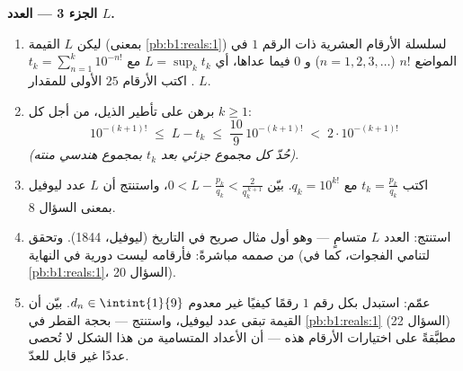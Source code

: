 \begin{problem}
\medskip
\noindent\textbf{الجزء 3 --- العدد $L$.}
\begin{enumerate}[resume]
  \item ليكن $L$ القيمة (بمعنى
        \cref{pb:b1:reals:1}) لسلسلة الأرقام العشرية ذات
        الرقم $1$ في المواضع $n!$ ($n = 1, 2, 3, \dots$)
        و $0$ فيما عداها، أي $L = \sup_k t_k$ مع $t_k =
        \sum_{n=1}^{k} 10^{-n!}$. اكتب الأرقام $25$
        الأولى للمقدار $L$.
  \item برهن على تأطير الذيل، من أجل كل $k \geq 1$:
        \[
        10^{-(k+1)!} \;\leq\; L - t_k \;\leq\;
        \frac{10}{9}\,10^{-(k+1)!} \;<\; 2\cdot 10^{-(k+1)!}
        \]
        \emph{(حُدّ كل مجموع جزئي بعد $t_k$ بمجموع
        هندسي منته)}.
  \item اكتب $t_k = \frac{p_k}{q_k}$ مع $q_k = 10^{k!}$.
        بيّن $0 < L - \frac{p_k}{q_k} < \frac{2}{q_k^{\,k+1}}$،
        واستنتج أن $L$ عدد ليوفيل بمعنى
        السؤال 8.
  \item استنتج: العدد $L$ متسامٍ --- وهو أول مثال صريح
        في التاريخ (ليوفيل، 1844). وتحقق من صممه
        مباشرةً: فأرقامه ليست دورية في النهاية (لتنامي الفجوات، كما في \cref{pb:b1:reals:1}،
        السؤال 20).
  \item عمّم: استبدل بكل رقم $1$ رقمًا كيفيًا
        غير معدوم $d_n \in \intint{1}{9}$. بيّن أن القيمة
        تبقى عدد ليوفيل، واستنتج --- بحجة القطر
        في \cref{pb:b1:reals:1} (السؤال 22) مطبَّقةً
        على اختيارات الأرقام هذه --- أن الأعداد المتسامية
        من هذا الشكل لا تُحصى عددًا غير قابل للعدّ.
\end{enumerate}


\end{problem}
